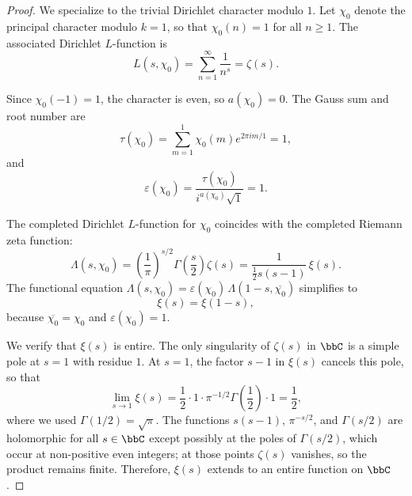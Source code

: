 \begin{proof}
	We specialize  to the trivial Dirichlet character modulo $1$. Let $\chi_0$ denote the principal character modulo $k = 1$, so that $\chi_0(n) = 1$ for all $n \geq 1$. The associated Dirichlet $L$-function is
	$$L(s, \chi_0) = \sum_{n=1}^\infty \frac{1}{n^s} = \zeta(s).$$

	Since $\chi_0(-1) = 1$, the character is even, so $a(\chi_0) = 0$. The Gauss sum and root number are
	$$\tau(\chi_0) = \sum_{m=1}^1 \chi_0(m) e^{2\pi i m / 1} = 1,$$
	and
	$$\varepsilon(\chi_0) = \frac{\tau(\chi_0)}{i^{a(\chi_0)} \sqrt{1}} = 1.$$

	The completed Dirichlet $L$-function for $\chi_0$ coincides with the completed Riemann zeta function:
	$$\Lambda(s, \chi_0) = \left( \frac{1}{\pi} \right)^{s/2} \Gamma\!\left( \frac{s}{2} \right) \zeta(s) = \frac{1}{\frac{1}{2} s (s - 1)} \, \xi(s).$$
	The functional equation $\Lambda(s, \chi_0) = \varepsilon(\chi_0) \, \Lambda(1 - s, \overline{\chi_0})$ simplifies to
	$$\xi(s) = \xi(1 - s),$$
	because $\overline{\chi_0} = \chi_0$ and $\varepsilon(\chi_0) = 1$.

	We verify that $\xi(s)$ is entire. The only singularity of $\zeta(s)$ in $\bbC$ is a simple pole at $s = 1$ with residue $1$. At $s = 1$, the factor $s - 1$ in $\xi(s)$ cancels this pole, so that
	$$\lim_{s \to 1} \xi(s) = \frac{1}{2} \cdot 1 \cdot \pi^{-1/2} \Gamma\!\left( \frac{1}{2} \right) \cdot 1 = \frac{1}{2},$$
	where we used $\Gamma(1/2) = \sqrt{\pi}$. The functions $s(s-1)$, $\pi^{-s/2}$, and $\Gamma(s/2)$ are holomorphic for all $s \in \bbC$ except possibly at the poles of $\Gamma(s/2)$, which occur at non-positive even integers; at those points $\zeta(s)$ vanishes, so the product remains finite. Therefore, $\xi(s)$ extends to an entire function on $\bbC$.


\end{proof}
